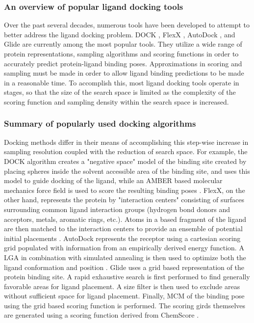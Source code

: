 \subsubsection{An overview of popular ligand docking tools}

Over the past several decades, numerous tools have been developed to attempt to better address the ligand docking problem.
DOCK \citep{Ewing:2001wu}, FlexX \citep{Hindle:2002tk}, AutoDock \citep{Morris:1998vi}, and Glide \citep{Friesner:2004hm} are currently among the most popular tools.
They utilize a wide range of protein representations, sampling algorithms and scoring functions in order to accurately predict protein-ligand binding poses.
Approximations in scoring and sampling must be made in order to allow ligand binding predictions to be made in a reasonable time.
To accomplish this, most ligand docking tools operate in stages, so that the size of the search space is limited as the complexity of the scoring function and sampling density within the search space is increased.

\subsubsection{Summary of popularly used docking algorithms}
Docking methods differ in their means of accomplishing this step-wise increase in sampling resolution coupled with the reduction of search space.
For example, the DOCK algorithm creates a "negative space" model of the binding site created by placing spheres inside the solvent accessible area of the binding site, and uses this model to guide docking of the ligand, while an AMBER based molecular mechanics force field is used to score the resulting binding poses \citep{Moustakas:2006fe}.
FlexX, on the other hand, represents the protein by "interaction centers" consisting of surfaces surrounding common ligand interaction groups (hydrogen bond donors and acceptors, metals, aromatic rings, etc.).
Atoms in a based fragment of the ligand are then matched to the interaction centers to provide an ensemble of potential initial placements \citep{Rarey:1996hf}.
AutoDock represents the receptor using a cartesian scoring grid populated with information from an empirically derived energy function.
A \ac{LGA} in combination with simulated annealing is then used to optimize both the ligand conformation and position \citep{Morris:1998vi}.
Glide uses a grid based representation of the protein binding site. A rapid exhaustive search is first performed to find generally favorable areas for ligand placement.
A size filter is then used to exclude areas without sufficient space for ligand placement.
Finally, \ac{MCM} of the binding pose using the grid based scoring function is performed.
The scoring girds themselves are generated using a scoring function derived from ChemScore \citep{Friesner:2004hm}.

